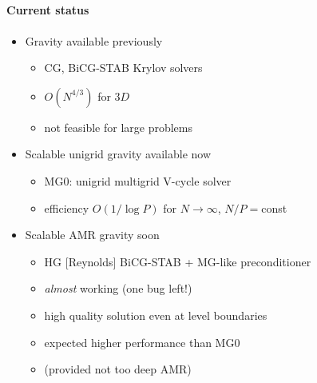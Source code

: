 \NEWSEC


\subsection{\ssRecentGravity}



%  
%
\begin{frame}[fragile,label=ss-recent-gravity] 
\secframetitle{\ssRecentGravity}
\framesubtitle{Current status}
\begin{itemize}
   \item Gravity available previously
\begin{itemize}
   \item        CG, BiCG-STAB Krylov solvers
 \item       $O(N^{4/3})$ for $3D$
\item       not feasible for large problems
\end{itemize}
   \item Scalable unigrid gravity available now
\begin{itemize}
   \item        MG0: unigrid multigrid V-cycle solver
\item         efficiency $O(1/\log P)$ for $N \rightarrow \infty$, $N/P = $const
\end{itemize}
   \item  Scalable AMR gravity soon
\begin{itemize}
\item HG [Reynolds] BiCG-STAB + MG-like preconditioner
\item         \textit{almost} working (one bug left!)
\item          high quality solution even at level boundaries
\item         expected higher performance than MG0
\item          (provided not too deep AMR)
\end{itemize}
\end{itemize}
\end{frame}
%
%
